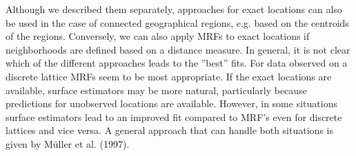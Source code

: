 \documentclass[11pt,a4paper,twoside]{bayesxarticle}
\begin{document}
Although we described them separately, approaches for exact
locations can also be used in the case of connected geographical
regions, e.g. based on the centroids of the regions. Conversely, we
can also apply MRFs to exact locations if neighborhoods are defined
based on a distance measure. In general, it is not clear which of
the different approaches leads to the ''best'' fits. For data
observed on a discrete lattice MRFs seem to be most appropriate. If
the exact locations are available, surface estimators may be more
natural, particularly because predictions for unobserved locations
are available. However, in some situations surface estimators lead
to an improved fit compared to MRF's even for discrete lattices and
vice versa. A general approach that can handle both situations is
given by M\"{u}ller et al. (1997).
\end{document}
